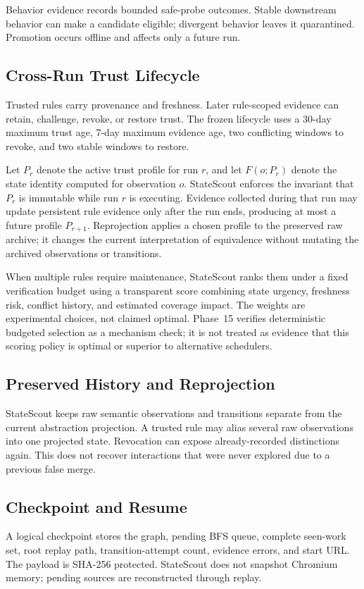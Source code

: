 \documentclass[conference]{IEEEtran}
\begin{document}
Behavior evidence records bounded safe-probe outcomes. Stable downstream behavior can make a candidate eligible; divergent behavior leaves it quarantined. Promotion occurs offline and affects only a future run.

\subsection{Cross-Run Trust Lifecycle}
Trusted rules carry provenance and freshness. Later rule-scoped evidence can retain, challenge, revoke, or restore trust. The frozen lifecycle uses a 30-day maximum trust age, 7-day maximum evidence age, two conflicting windows to revoke, and two stable windows to restore.

Let $P_r$ denote the active trust profile for run $r$, and let $F(o;P_r)$ denote the state identity computed for observation $o$. StateScout enforces the invariant that $P_r$ is immutable while run $r$ is executing. Evidence collected during that run may update persistent rule evidence only after the run ends, producing at most a future profile $P_{r+1}$. Reprojection applies a chosen profile to the preserved raw archive; it changes the current interpretation of equivalence without mutating the archived observations or transitions.

When multiple rules require maintenance, StateScout ranks them under a fixed verification budget using a transparent score combining state urgency, freshness risk, conflict history, and estimated coverage impact. The weights are experimental choices, not claimed optimal. Phase~15 verifies deterministic budgeted selection as a mechanism check; it is not treated as evidence that this scoring policy is optimal or superior to alternative schedulers.

\subsection{Preserved History and Reprojection}
StateScout keeps raw semantic observations and transitions separate from the current abstraction projection. A trusted rule may alias several raw observations into one projected state. Revocation can expose already-recorded distinctions again. This does not recover interactions that were never explored due to a previous false merge.

\subsection{Checkpoint and Resume}
A logical checkpoint stores the graph, pending BFS queue, complete seen-work set, root replay path, transition-attempt count, evidence errors, and start URL. The payload is SHA-256 protected. StateScout does not snapshot Chromium memory; pending sources are reconstructed through replay.
\end{document}

